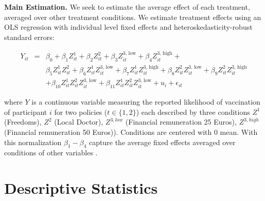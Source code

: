 \documentclass[12pt]{article}
\begin{document}
\noindent \textbf{Main Estimation.} We seek to estimate the average effect of each treatment, averaged over other treatment conditions. 
We estimate treatment effects using an OLS regression with individual level fixed effects and heteroskedasticity-robust standard errors:

\begin{eqnarray*}
Y_{it}&=&\beta_0 + \beta_1 Z^1_{it} + \beta_2 Z^2_{it} + \beta_3 Z^\text{3, low}_{it}  + \beta_4 Z^\text{3, high}_{it} + \\
&& \beta_5 Z^1_{it}Z^2_{it} + \beta_6 Z^1_{it}Z^\text{3, low}_{it}  + \beta_7 Z^1_{it}Z^\text{3, high}_{it} + \beta_8 Z^2_{it}Z^\text{3, low}_{it}  + \beta_9 Z^2_{it}Z^\text{3, high}_{it}\\
&&  + \beta_{10} Z^1_{it}Z^2_{it}Z^\text{3, low}_{it} + \beta_{11} Z^1_{it}Z^2_{it}Z^\text{3, low}_{it} + u_i +  \epsilon_{it}
\end{eqnarray*}

where \(Y\) is a continuous variable measuring the reported likelihood of
vaccination of participant \(i\) for two policies ($t\in\{1,2\}$) each described by three conditions $Z^1$ (Freedoms), $Z^2$ (Local Doctor), $Z^{3, low}$ (Financial remuneration 25 Euros), $Z^{3, high}$ (Financial remuneration 50 Euros)). Conditions are centered with 0 mean. With this normalization $\beta_1 - \beta_4$ capture the average fixed effects averaged over conditions of other variables \cite{lin2013agnostic}. 


\clearpage
\section{Descriptive Statistics}  



\end{document}
